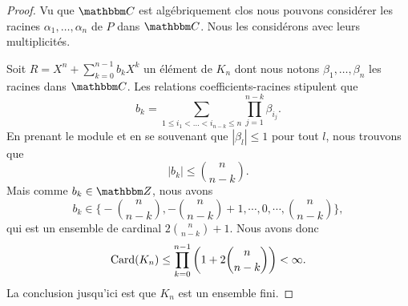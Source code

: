 \begin{proof}
    Vu que \( \eC\) est algébriquement clos
    nous pouvons considérer les racines \( \alpha_1,\ldots, \alpha_n\) de \( P\) dans \( \eC\). Nous les considérons avec leurs multiplicités.

    Soit \( R=X^n+\sum_{k=0}^{n-1}b_kX^k\) un élément de \( K_n\) dont nous notons \( \beta_1,\ldots, \beta_n\) les racines dans \( \eC\). Les relations coefficients-racines stipulent que
    \begin{equation}
        b_k=\sum_{1\leq i_1<\ldots <i_{n-k}\leq n}\prod_{j=1}^{n-k}\beta_{i_j}.
    \end{equation}
    En prenant le module et en se souvenant que \( | \beta_{l} |\leq 1\) pour tout \( l\), nous trouvons que
    \begin{equation}
        | b_k |\leq\binom{ n }{ n-k }.
    \end{equation}
    Mais comme \( b_k\in \eZ\), nous avons
    \begin{equation}
        b_k\in\big\{    -\binom{ n }{ n-k },-\binom{ n }{ n-k }+1,\cdots, 0,\cdots,\binom{ n }{ n-k }   \big\},
    \end{equation}
    qui est un ensemble de cardinal \( 2 \binom{ n }{ n-k }+1\). Nous avons donc
    \begin{equation}
        \operatorname{Card}(K_n)\leq\prod_{k=0}^{n-1}\bigg( 1+2 \binom{ n }{ n-k } \bigg)<\infty.
    \end{equation}
    La conclusion jusqu'ici est que \( K_n\) est un ensemble fini.


\end{proof}
